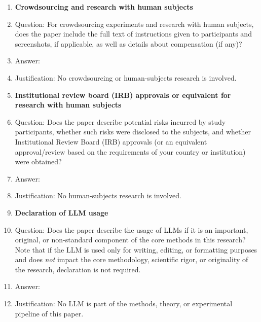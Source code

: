 \begin{enumerate}
\item {\bf Crowdsourcing and research with human subjects}
    \item[] Question: For crowdsourcing experiments and research with human subjects, does the paper include the full text of instructions given to participants and screenshots, if applicable, as well as details about compensation (if any)? 
    \item[] Answer: \answerNA{}
    \item[] Justification: No crowdsourcing or human-subjects
    research is involved.

\item {\bf Institutional review board (IRB) approvals or equivalent for research with human subjects}
    \item[] Question: Does the paper describe potential risks incurred by study participants, whether such risks were disclosed to the subjects, and whether Institutional Review Board (IRB) approvals (or an equivalent approval/review based on the requirements of your country or institution) were obtained?
    \item[] Answer: \answerNA{}
    \item[] Justification: No human-subjects research is involved.

\item {\bf Declaration of LLM usage}
    \item[] Question: Does the paper describe the usage of LLMs if it is an important, original, or non-standard component of the core methods in this research? Note that if the LLM is used only for writing, editing, or formatting purposes and does \emph{not} impact the core methodology, scientific rigor, or originality of the research, declaration is not required.
    \item[] Answer: \answerNA{}
    \item[] Justification: No LLM is part of the methods, theory,
    or experimental pipeline of this paper.

\end{enumerate}
